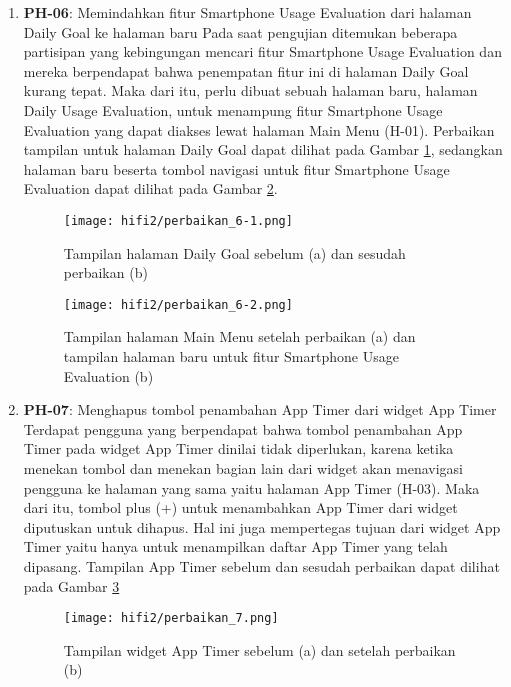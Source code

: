 \begin{enumerate}
  \item \textbf{PH-06}: Memindahkan fitur Smartphone Usage Evaluation dari halaman Daily Goal ke halaman baru
  \subitem Pada saat pengujian ditemukan beberapa partisipan yang kebingungan mencari fitur Smartphone Usage Evaluation dan mereka berpendapat bahwa penempatan fitur ini di halaman Daily Goal kurang tepat. Maka dari itu, perlu dibuat sebuah halaman baru, halaman Daily Usage Evaluation, untuk menampung fitur Smartphone Usage Evaluation yang dapat diakses lewat halaman Main Menu (H-01). Perbaikan tampilan untuk halaman Daily Goal dapat dilihat pada Gambar \ref{img:perbaikan_6-1}, sedangkan halaman baru beserta tombol navigasi untuk fitur Smartphone Usage Evaluation dapat dilihat pada Gambar \ref{img:perbaikan_6-2}.
  
  \begin{figure}[h]
    \centering
    \texttt{[image: hifi2/perbaikan\_6-1.png]}
    \caption{Tampilan halaman Daily Goal sebelum (a) dan sesudah perbaikan (b)}
    \label{img:perbaikan_6-1}
  \end{figure}
  \FloatBarrier
  
  \begin{figure}[h]
    \centering
    \texttt{[image: hifi2/perbaikan\_6-2.png]}
    \caption{Tampilan halaman Main Menu setelah perbaikan (a) dan tampilan halaman baru untuk fitur Smartphone Usage Evaluation (b)}
    \label{img:perbaikan_6-2}
  \end{figure}
  \FloatBarrier

  \item \textbf{PH-07}: Menghapus tombol penambahan App Timer dari widget App Timer
  \subitem Terdapat pengguna yang berpendapat bahwa tombol penambahan App Timer pada widget App Timer dinilai tidak diperlukan, karena ketika menekan tombol dan menekan bagian lain dari widget akan menavigasi pengguna ke halaman yang sama yaitu halaman App Timer (H-03). Maka dari itu, tombol plus (+) untuk menambahkan App Timer dari widget diputuskan untuk dihapus. Hal ini juga mempertegas tujuan dari widget App Timer yaitu hanya untuk menampilkan daftar App Timer yang telah dipasang. Tampilan App Timer sebelum dan sesudah perbaikan dapat dilihat pada Gambar \ref{img:perbaikan_7}    

  \begin{figure}[h]
    \centering
    \texttt{[image: hifi2/perbaikan\_7.png]}
    \caption{Tampilan widget App Timer sebelum (a) dan setelah perbaikan (b)}
    \label{img:perbaikan_7}
  \end{figure}
  \FloatBarrier
  
\end{enumerate}
